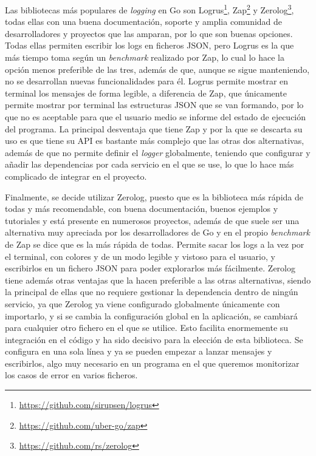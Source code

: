Las bibliotecas más populares de \textit{logging} en Go son
Logrus\footnote{\url{https://github.com/sirupsen/logrus}},
Zap\footnote{\url{https://github.com/uber-go/zap}} y
Zerolog\footnote{\url{https://github.com/rs/zerolog}}, todas ellas con una buena
documentación, soporte y amplia comunidad de desarrolladores y proyectos que las
amparan, por lo que son buenas opciones. Todas ellas permiten escribir los logs
en ficheros JSON, pero Logrus es la que más tiempo toma según un
\textit{benchmark} realizado por Zap, lo cual lo hace la opción menos preferible
de las tres, además de que, aunque se sigue manteniendo, no se desarrollan
nuevas funcionalidades para él. Logrus permite mostrar en terminal los mensajes
de forma legible, a diferencia de Zap, que únicamente permite mostrar por terminal las
estructuras JSON que se van formando, por lo que no es aceptable para que el
usuario medio se informe del estado de ejecución del programa. La principal
desventaja que tiene Zap y por la que se descarta su uso es que tiene su API es
bastante más complejo que las otras dos alternativas, además de que no permite
definir el \textit{logger} globalmente, teniendo que configurar y añadir las
dependencias por cada servicio en el que se use, lo que lo hace más complicado
de integrar en el proyecto.

Finalmente, se decide utilizar Zerolog, puesto que es la biblioteca más rápida de
todas y más recomendable, con buena documentación, buenos ejemplos y tutoriales
y está presente en numerosos proyectos, además de que suele ser una alternativa
muy apreciada por los desarrolladores de Go \cite{zerolog} y en el propio
\textit{benchmark} de Zap se dice que es la más rápida de todas. Permite sacar
los logs a la vez por el terminal, con colores y de un modo legible y vistoso para
el usuario, y escribirlos en un fichero JSON para poder explorarlos más
fácilmente. Zerolog tiene además otras ventajas que la hacen preferible a las
otras alternativas, siendo la principal de ellas que no requiere gestionar la
dependencia dentro de ningún servicio, ya que Zerolog ya viene configurado
globalmente únicamente con importarlo, y si se cambia la configuración global en
la aplicación, se cambiará para cualquier otro fichero en el que se utilice.
Esto facilita enormemente su integración en el código y ha sido decisivo para la
elección de esta biblioteca. Se configura en una sola línea y ya se
pueden empezar a lanzar mensajes y escribirlos, algo muy necesario en un
programa en el que queremos monitorizar los casos de error en varios ficheros.

